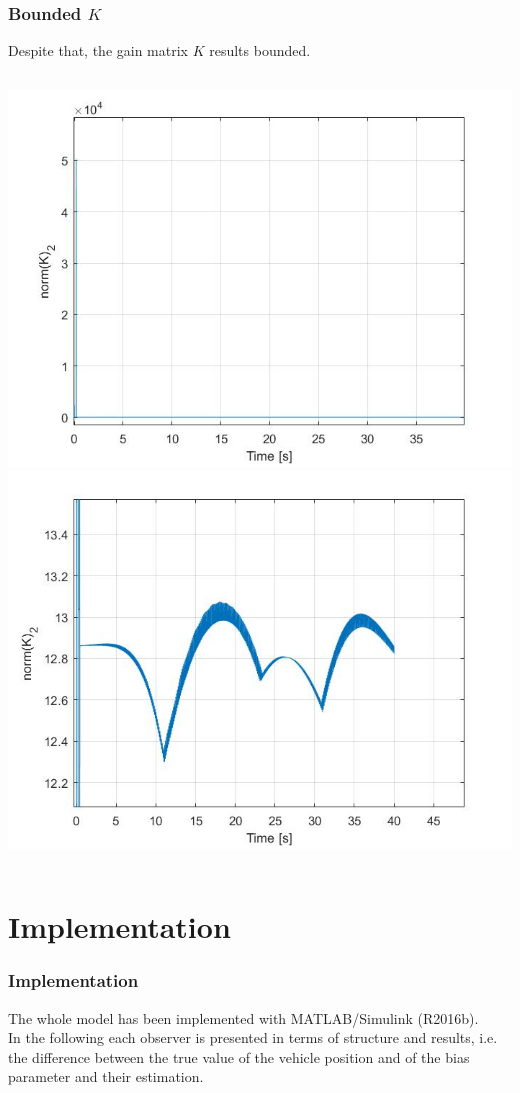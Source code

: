 \documentclass{beamer}
\begin{document}
	\begin{frame}
		\frametitle{Bounded $K$}
		Despite that, the gain matrix $K$ results bounded.
		\begin{columns}[t]
			\centering
			\includegraphics[scale=0.25]{kric}\\
			\centering
			\includegraphics[scale=0.25]{kric2}\\
		\end{columns}
	\end{frame}
\section{Implementation}	
	\begin{frame}
		\frametitle{Implementation}
		The whole model has been implemented with MATLAB/Simulink (R2016b).
		\\
		\vspace{0.5cm}
		In the following each observer is presented in terms of structure and results, i.e. the difference between the true value of the vehicle position and of the bias parameter and their estimation.
	\end{frame}
	
\end{document}
